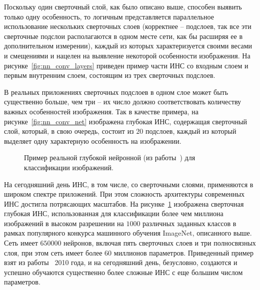 \documentclass[a4paper,12pt,russian]{article} %
\begin{document}
Поскольку один сверточный слой, как было описано выше, способен выявить только одну особенность, то логичным представляется параллельное использование нескольких сверточных слоев (корректнее -- подслоев, так все эти сверточные подслои располагаются в одном месте сети, как бы расширяя ее в дополнительном измерении), каждый из которых характеризуется своими весами и смещениями и нацелен на выявление некоторой особенности изображения.
На рисунке~\ref{fig:nn_conv_layers} приведен пример части ИНС со входным слоем и первым внутренним слоем, состоящим из трех сверточных подслоев.

В реальных приложениях сверточных подслоев в одном слое может быть существенно больше, чем три -- их число должно соответствовать количеству важных особенностей изображения.
Так в качестве примера, на рисунке~\ref{fig:nn_conv_net} изображена глубокая ИНС, содержащая сверточный слой, который, в свою очередь, состоит из $20$ подслоев, каждый из который выделяет одну характерную особенность на изображении.

\begin{figure}[t!]
	\caption{
		Пример реальной глубокой нейронной (из работы~\cite{krizhevsky2012imagenet}) для классификации изображений.
        }
        \label{fig:nn_real}
\end{figure}

На сегодняшний день ИНС, в том числе, со сверточными слоями, применяются в широком спектре приложений.
При этом сложность архитектуры современных ИНС достигла потрясающих масштабов.
На рисунке~\ref{fig:nn_real} изображена сверточная глубокая ИНС, использованная для классификации более чем миллиона изображений в высоком разрешении на $1000$ различных заданных классов в рамках популярного конкурса машинного обучения ImageNet, описанного выше.
Сеть имеет $650000$ нейронов, включая пять сверточных слоев и три полносвязных слоя, при этом сеть имеет более $60$ миллионов параметров.
Приведенный пример взят из работы~\cite{krizhevsky2012imagenet} 2010 года, и на сегодняшний день, безусловно, создаются и успешно обучаются существенно более сложные ИНС с еще большим числом параметров.
\end{document}
